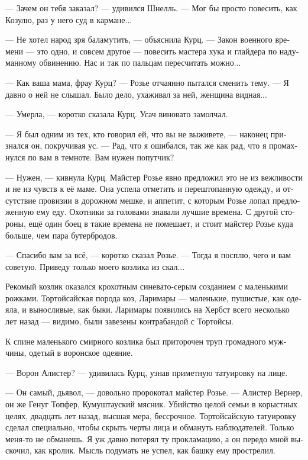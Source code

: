 \documentclass[a4paper,12pt,fleqn]{book}\usepackage{cooltooltips}\usepackage{polyglossia}\setdefaultlanguage[babelshorthands=true]{russian}\setotherlanguage{english}\defaultfontfeatures{Ligatures=TeX,Mapping=tex-text} \usepackage{xcolor}\definecolor{lightgray}{HTML}{bbbbbb}\color{lightgray}\newcommand{\ml}[3]{\textenglish{\textcolor{black}{#3}}}
\begin{document}
--- Зачем он тебя заказал? --- удивился Шнелль.
--- Мог бы просто повесить, как Козулю, раз у него суд в кармане...

--- Не хотел народ зря баламутить, --- объяснила Курц.
--- Закон военного времени --- это одно, и совсем другое --- повесить мастера хука и глайдера по надуманному обвинению.
Нас и так по пальцам пересчитать можно...

--- Как ваша мама, фрау Курц? --- Розье отчаянно пытался сменить тему.
--- Я давно о ней не слышал.
Было дело, ухаживал за ней, женщина видная...

--- Умерла, --- коротко сказала Курц.
Усач виновато замолчал.

--- Я был одним из тех, кто говорил ей, что вы не выживете, --- наконец признался он, покручивая ус.
--- Рад, что я ошибался, так же как рад, что я промахнулся по вам в темноте.
Вам нужен попутчик?

--- Нужен, --- кивнула Курц.
Майстер Розье явно предложил это не из вежливости и не из чувств к её маме.
Она успела отметить и перештопанную одежду, и отсутствие провизии в дорожном мешке, и аппетит, с которым Розье лопал предложенную ему еду.
Охотники за головами знавали лучшие времена.
С другой стороны, ещё один боец в такие времена не помешает, и стоит майстер Розье куда больше, чем пара бутербродов.

--- Спасибо вам за всё, --- коротко сказал Розье.
--- Тогда я посплю, чего и вам советую.
Приведу только моего козлика из скал...

Рекомый козлик оказался крохотным синевато-серым созданием с маленькими рожками.
Тортойсайская порода коз, Ларимары --- маленькие, пушистые, как одеяла, и выносливые, как быки.
Ларимары появились на Хербст всего несколько лет назад --- видимо, были завезены контрабандой с Тортойсы.

К спине маленького смирного козлика был приторочен труп громадного мужчины, одетый в воронское одеяние.

--- Ворон Алистер? --- удивилась Курц, узнав приметную татуировку на лице.

--- Он самый, дьявол, --- довольно пророкотал майстер Розье.
--- Алистер Вернер, он же Генуг Топфер, Кумуштауский мясник.
Убийство целой семьи в корыстных целях, двадцать лет назад, высшая мера, бессрочное.
Тортойсайскую татуировку сделал специально, чтобы скрыть черты лица и обмануть наблюдателей.
Только меня-то не обманешь.
Я уж давно потерял ту прокламацию, а он передо мной выскочил, как кролик.
Мысль подумать не успел, как башку ему прострелил.
\end{document}
